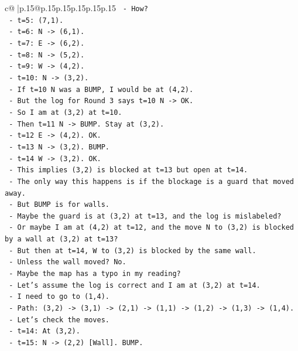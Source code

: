 \documentclass{article}
\begin{document}
{\begin{supertabular}{c@{$\;$}|p{.15\linewidth}@{}p{.15\linewidth}p{.15\linewidth}p{.15\linewidth}p{.15\linewidth}p{.15\linewidth}}
{{{\texttt{    {-} How?} \\
\texttt{    {-} t=5: (7,1).} \\
\texttt{    {-} t=6: N {-}> (6,1).} \\
\texttt{    {-} t=7: E {-}> (6,2).} \\
\texttt{    {-} t=8: N {-}> (5,2).} \\
\texttt{    {-} t=9: W {-}> (4,2).} \\
\texttt{    {-} t=10: N {-}> (3,2).} \\
\texttt{    {-} If t=10 N was a BUMP, I would be at (4,2).} \\
\texttt{    {-} But the log for Round 3 says t=10 N {-}> OK.} \\
\texttt{    {-} So I am at (3,2) at t=10.} \\
\texttt{    {-} Then t=11 N {-}> BUMP. Stay at (3,2).} \\
\texttt{    {-} t=12 E {-}> (4,2). OK.} \\
\texttt{    {-} t=13 N {-}> (3,2). BUMP.} \\
\texttt{    {-} t=14 W {-}> (3,2). OK.} \\
\texttt{    {-} This implies (3,2) is blocked at t=13 but open at t=14.} \\
\texttt{    {-} The only way this happens is if the blockage is a guard that moved away.} \\
\texttt{    {-} But BUMP is for walls.} \\
\texttt{    {-} Maybe the guard is at (3,2) at t=13, and the log is mislabeled?} \\
\texttt{    {-} Or maybe I am at (4,2) at t=12, and the move N to (3,2) is blocked by a wall at (3,2) at t=13?} \\
\texttt{    {-} But then at t=14, W to (3,2) is blocked by the same wall.} \\
\texttt{    {-} Unless the wall moved? No.} \\
\texttt{    {-} Maybe the map has a typo in my reading?} \\
\texttt{    {-} Let's assume the log is correct and I am at (3,2) at t=14.} \\
\texttt{    {-} I need to go to (1,4).} \\
\texttt{    {-} Path: (3,2) {-}> (3,1) {-}> (2,1) {-}> (1,1) {-}> (1,2) {-}> (1,3) {-}> (1,4).} \\
\texttt{    {-} Let's check the moves.} \\
\texttt{    {-} t=14: At (3,2).} \\
\texttt{    {-} t=15: N {-}> (2,2) {[}Wall{]}. BUMP.} \\
}}}
\end{supertabular}}
\end{document}
